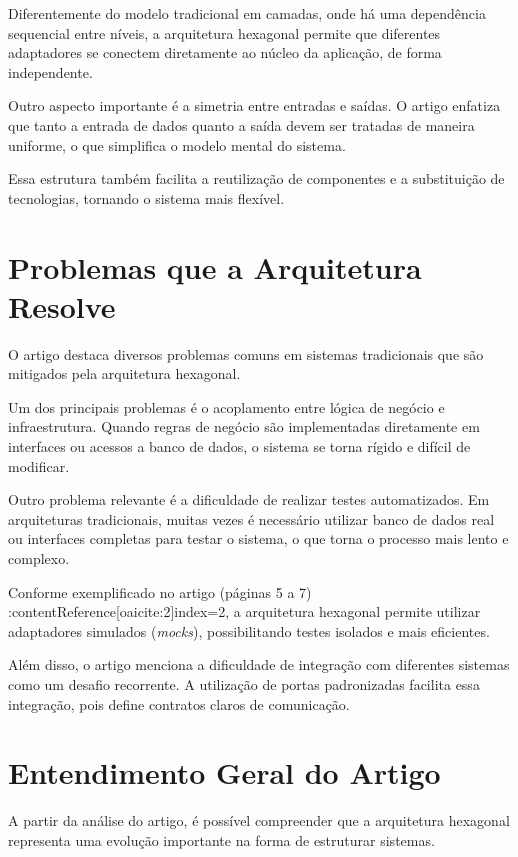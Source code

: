 \documentclass[conference]{IEEEtran}
\begin{document}
Diferentemente do modelo tradicional em camadas, onde há uma dependência sequencial entre níveis, a arquitetura hexagonal permite que diferentes adaptadores se conectem diretamente ao núcleo da aplicação, de forma independente.

Outro aspecto importante é a simetria entre entradas e saídas. O artigo enfatiza que tanto a entrada de dados quanto a saída devem ser tratadas de maneira uniforme, o que simplifica o modelo mental do sistema.

Essa estrutura também facilita a reutilização de componentes e a substituição de tecnologias, tornando o sistema mais flexível.

\section{Problemas que a Arquitetura Resolve}

O artigo destaca diversos problemas comuns em sistemas tradicionais que são mitigados pela arquitetura hexagonal.

Um dos principais problemas é o acoplamento entre lógica de negócio e infraestrutura. Quando regras de negócio são implementadas diretamente em interfaces ou acessos a banco de dados, o sistema se torna rígido e difícil de modificar.

Outro problema relevante é a dificuldade de realizar testes automatizados. Em arquiteturas tradicionais, muitas vezes é necessário utilizar banco de dados real ou interfaces completas para testar o sistema, o que torna o processo mais lento e complexo.

Conforme exemplificado no artigo (páginas 5 a 7) :contentReference[oaicite:2]{index=2}, a arquitetura hexagonal permite utilizar adaptadores simulados (\textit{mocks}), possibilitando testes isolados e mais eficientes.

Além disso, o artigo menciona a dificuldade de integração com diferentes sistemas como um desafio recorrente. A utilização de portas padronizadas facilita essa integração, pois define contratos claros de comunicação.

\section{Entendimento Geral do Artigo}

A partir da análise do artigo, é possível compreender que a arquitetura hexagonal representa uma evolução importante na forma de estruturar sistemas.
\end{document}
